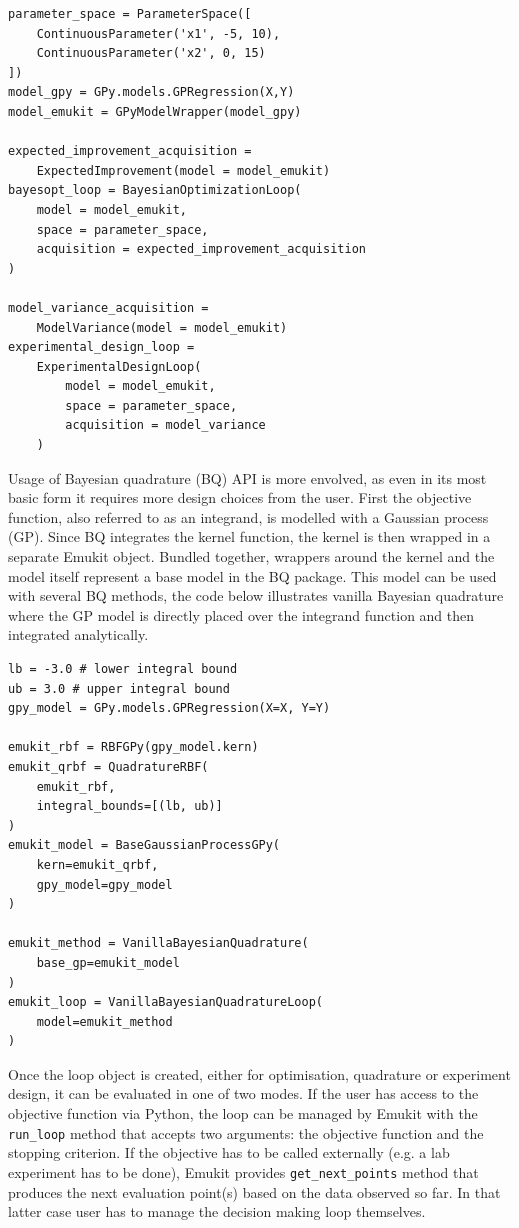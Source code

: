 \begin{verbatim}
parameter_space = ParameterSpace([
    ContinuousParameter('x1', -5, 10),
    ContinuousParameter('x2', 0, 15)
])
model_gpy = GPy.models.GPRegression(X,Y)
model_emukit = GPyModelWrapper(model_gpy)

expected_improvement_acquisition =
    ExpectedImprovement(model = model_emukit)
bayesopt_loop = BayesianOptimizationLoop(
    model = model_emukit,
    space = parameter_space,
    acquisition = expected_improvement_acquisition
)

model_variance_acquisition =
    ModelVariance(model = model_emukit)
experimental_design_loop =
    ExperimentalDesignLoop(
        model = model_emukit,
        space = parameter_space,
        acquisition = model_variance
    )
\end{verbatim}

Usage of Bayesian quadrature (BQ) API is more envolved, as even in its most basic form it requires more design choices from the user. First the objective function, also referred to as an integrand, is modelled with a Gaussian process (GP). Since BQ integrates the kernel function, the kernel is then wrapped in a separate Emukit object. Bundled together, wrappers around the kernel and the model itself represent a base model in the BQ package. This model can be used with several BQ methods, the code below illustrates vanilla Bayesian quadrature where the GP model is directly placed over the integrand function and then integrated analytically.

\begin{verbatim}
lb = -3.0 # lower integral bound
ub = 3.0 # upper integral bound
gpy_model = GPy.models.GPRegression(X=X, Y=Y)

emukit_rbf = RBFGPy(gpy_model.kern)
emukit_qrbf = QuadratureRBF(
    emukit_rbf,
    integral_bounds=[(lb, ub)]
)
emukit_model = BaseGaussianProcessGPy(
    kern=emukit_qrbf,
    gpy_model=gpy_model
)

emukit_method = VanillaBayesianQuadrature(
    base_gp=emukit_model
)
emukit_loop = VanillaBayesianQuadratureLoop(
    model=emukit_method
)
\end{verbatim}

Once the loop object is created, either for optimisation, quadrature or experiment design, it can be evaluated in one of two modes. If the user has access to the objective function via Python, the loop can be managed by Emukit with the \texttt{run\_loop} method that accepts two arguments: the objective function and the stopping criterion. If the objective has to be called externally (e.g. a lab experiment has to be done), Emukit provides \texttt{get\_next\_points} method that produces the next evaluation point(s) based on the data observed so far. In that latter case user has to manage the decision making loop themselves.

